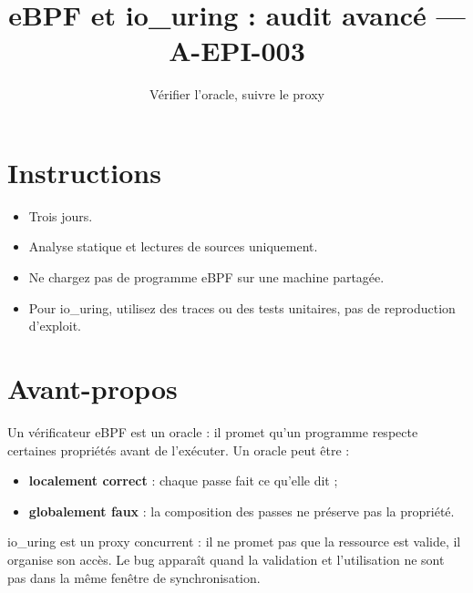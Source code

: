 \documentclass{training}
\begin{document}
\title{eBPF et io\_uring : audit avancé --- A-EPI-003}
\subtitle{Vérifier l'oracle, suivre le proxy}
\maketitle

\newpage
\tableofcontents
\newpage

\chapter{Instructions}
\begin{itemize}
  \item Trois jours.
  \item Analyse statique et lectures de sources uniquement.
  \item Ne chargez pas de programme eBPF sur une machine partagée.
  \item Pour io\_uring, utilisez des traces ou des tests unitaires, pas de
        reproduction d'exploit.
\end{itemize}





\chapter{Avant-propos}

Un vérificateur eBPF est un oracle : il promet qu'un programme respecte
certaines propriétés avant de l'exécuter. Un oracle peut être :

\begin{itemize}
  \item \textbf{localement correct} : chaque passe fait ce qu'elle dit ;
  \item \textbf{globalement faux} : la composition des passes ne préserve
        pas la propriété.
\end{itemize}

io\_uring est un proxy concurrent : il ne promet pas que la ressource est
valide, il organise son accès. Le bug apparaît quand la validation et
l'utilisation ne sont pas dans la même fenêtre de synchronisation.
\end{document}
